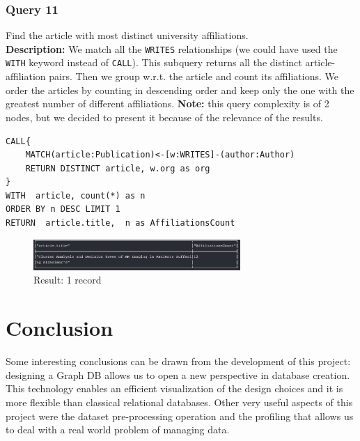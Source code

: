 \documentclass{Configuration_Files/PoliMi3i_thesis}
\begin{document}
\subsection{Query 11}
Find the article with most distinct university affiliations.\\
\textbf{Description:} We match all the \verb |WRITES| relationships (we could have used the \verb |WITH| keyword instead
of \verb |CALL|). This subquery returns all the distinct article-affiliation pairs. Then we group w.r.t. the article and
count its affiliations. We order the articles by counting in descending order and keep only the one with the greatest
number of different affiliations.
\textbf{Note:} this query complexity is of 2 nodes, but we decided to present it because of the relevance of the results.
\begin{lstlisting}[language=cypher, label=lst:cypher-example]
CALL{
    MATCH(article:Publication)<-[w:WRITES]-(author:Author)
    RETURN DISTINCT article, w.org as org
}
WITH  article, count(*) as n
ORDER BY n DESC LIMIT 1
RETURN  article.title,  n as AffiliationsCount
\end{lstlisting}
\begin{figure}[H]
\centering
\includegraphics[width=0.7\textwidth]{query/query11.PNG}
\caption{Result: 1 record}
\label{fig:query11}
\end{figure}


\chapter{Conclusion}
Some interesting conclusions can be drawn from the development of this project: designing a Graph DB allows us to open a new
perspective in database creation. This technology enables an efficient visualization of the design choices and it is more
flexible than classical relational databases. \newline
Other very useful aspects of this project were the dataset pre-processing operation and the profiling that allows us to deal
with a real world problem of managing data.
\end{document}
